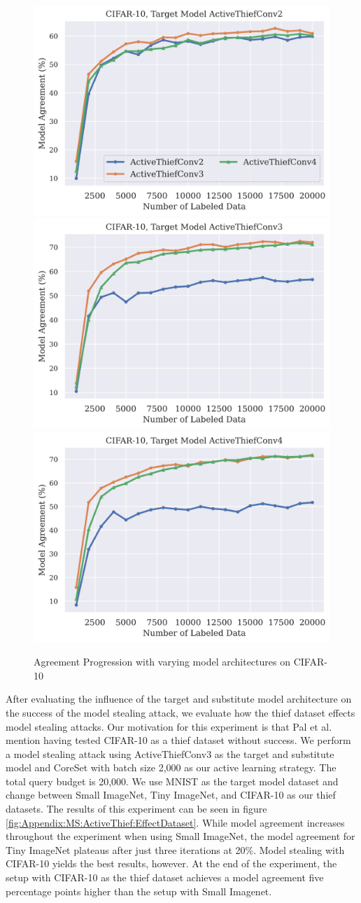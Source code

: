 \begin{figure}[!htb]
    \centering
    \includegraphics[width=0.32\linewidth]{images/MSInsights/cifar_act2.png} \hfill
    \includegraphics[width=0.32\linewidth]{images/MSInsights/cifar_act3.png} \hfill
    \includegraphics[width=0.32\linewidth]{images/MSInsights/cifar_act4.png}
    \caption{Agreement Progression with varying model architectures on CIFAR-10}
    \label{fig:CIFAR10modelComp}
\end{figure}


After evaluating the influence of the target and substitute model architecture on the success of the model stealing attack, we evaluate how the thief dataset effects
model stealing attacks. Our motivation for this experiment is that Pal et al. mention having tested CIFAR-10 as a thief dataset without success. We perform a model
stealing attack using ActiveThiefConv3 as the target and substitute model and CoreSet with batch size 2,000 as our active learning strategy. The total query budget is
20,000. We use MNIST as the target model dataset and change between Small ImageNet, Tiny ImageNet, and CIFAR-10 as our thief datasets. The results of this experiment
can be seen in figure \ref{fig:Appendix:MS:ActiveThief:EffectDataset}. While model agreement increases throughout the experiment when using Small ImageNet, the model
agreement for Tiny ImageNet plateaus after just three iterations at 20\%. Model stealing with CIFAR-10 yields the best results, however. At the end of the experiment,
the setup with CIFAR-10 as the thief dataset achieves a model agreement five percentage points higher than the setup with Small Imagenet. \par

